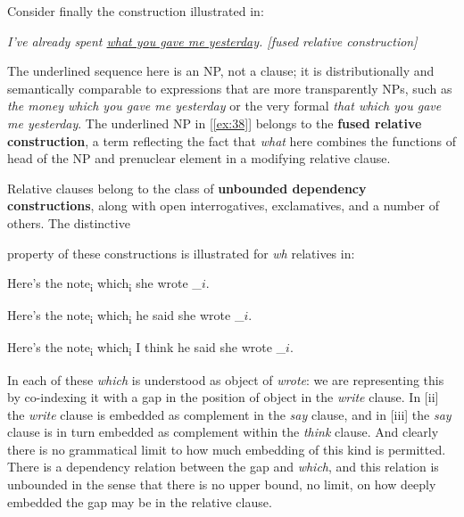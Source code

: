 Consider finally the construction illustrated in:
\begin{examples}
    \item \label{ex:38} \itshape I've already spent \uline{what you gave me yesterday}. \hfill \textnormal{[fused relative construction]}
\end{examples}

The underlined sequence here is an NP, not a clause; it is distributionally and semantically comparable to expressions that are more transparently NPs, such as \textit{the money which you gave me yesterday} or the very formal \textit{that which you gave me yesterday}. The underlined NP in [\ref{ex:38}] belongs to the \textbf{fused relative construction}, a term reflecting the fact that \textit{what} here combines the functions of head of the NP and prenuclear element in a modifying relative clause.

Relative clauses belong to the class of \textbf{unbounded dependency constructions}, along with open interrogatives, exclamatives, and a number of others. The distinctive 

\newpage

\noindent property of these constructions is illustrated for \textit{wh} relatives in:
\begin{examples}
\item \label{ex:39}
    \begin{examples}
        \item Here's the note\textsubscript{i} \ob which\textsubscript{i} she wrote \_$i$\cb.
        \item Here's the note\textsubscript{i} \ob which\textsubscript{i} he said she wrote \_$i$\cb.
        \item Here's the note\textsubscript{i} \ob which\textsubscript{i} I think he said she wrote \_$i$\cb.
    \end{examples}
\end{examples}
In each of these \textit{which} is understood as object of \textit{wrote}: we are representing this by co-indexing it with a gap in the position of object in the \textit{write} clause. In [ii] the \textit{write} clause is embedded as complement in the \textit{say} clause, and in [iii] the \textit{say} clause is in turn embedded as complement within the \textit{think} clause. And clearly there is no grammatical limit to how much embedding of this kind is permitted. There is a dependency relation between the gap and \textit{which}, and this relation is {unbounded} in the sense that there is no upper bound, no limit, on how deeply embedded the gap may be in the relative clause.


